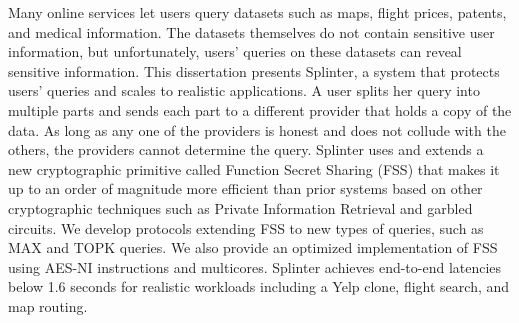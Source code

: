 Many online services let users query datasets such as maps, flight prices, patents,
and medical information. The datasets themselves do not contain sensitive user information,
but unfortunately, users' queries on these datasets can reveal sensitive information.
This dissertation presents Splinter, a system that protects users' queries and
scales to realistic applications.
A user splits her query into multiple parts and sends each part 
to a different provider that holds a copy of the data.
As long as any one of the providers is honest and does not collude with the
others, the providers cannot determine the query.
Splinter uses and extends a new cryptographic primitive called Function Secret Sharing (FSS) 
that makes it up to an order of magnitude more efficient than prior systems based on 
other cryptographic techniques such as Private Information Retrieval and garbled circuits.
We develop protocols extending FSS to new types of queries, such as MAX and TOPK queries. 
We also provide an optimized implementation of FSS using AES-NI instructions and multicores.
Splinter achieves end-to-end latencies below 1.6 seconds for realistic workloads 
including a Yelp clone, flight search, and map routing.

%
